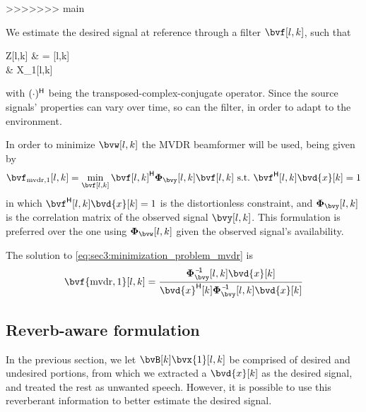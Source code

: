 >>>>>>> main

We estimate the desired signal at reference through a filter $\bvf[l,k]$, such that
\begin{equations}
	Z[l,k]
	& = \he{\bvf}[l,k] \bvy[l,k] \\
	& \approx X_1[l,k]
\end{equations}
with $(\cdot)^{\mathsf{H}}$ being the transposed-complex-conjugate operator. Since the source signals' properties can vary over time, so can the filter, in order to adapt to the environment.

In order to minimize $\bvw[l,k]$ the MVDR beamformer \cite{erdogan_improved_2016} will be used, being given by
\begin{equation}
	\label{eq:sec3:minimization_problem_mvdr}
	\bvf_{\mvdr,1}[l,k] = \min_{\bvf[l,k]} \he{\bvf[l,k]} \Corr{\bvy}[l,k] \bvf[l,k]~\text{s.t.}~\he{\bvf}[l,k] \bvd{x}[k] = 1
\end{equation}
in which $\he{\bvf}[l,k] \bvd{x}[k] = 1$ is the distortionless constraint, and $\Corr{\bvy}[l,k]$ is the correlation matrix of the observed signal $\bvy[l,k]$. This formulation is preferred over the one using $\Corr{\bvw}[l,k]$ given the observed signal's availability.

The solution to \cref{eq:sec3:minimization_problem_mvdr} is
\begin{equation}
	\label{eq:sec3:solution_mvdr_beamformer}
	\bvf{\mvdr,1}[l,k] = \frac{ \inv{\Corr{\bvy}}[l,k] \bvd{x}[k] }{ \he{\bvd{x}}[k] \inv{\Corr{\bvy}}[l,k] \bvd{x}[k] }
\end{equation}

\subsection{Reverb-aware formulation}\label{subsec:sec3:reverb-aware_formulation}
In the previous section, we let $\bvB[k]\bvx{1}[l,k]$ be comprised of desired and undesired portions, from which we extracted a $\bvd{x}[k]$ as the desired signal, and treated the rest as unwanted speech. However, it is possible to use this reverberant information to better estimate the desired signal.%

